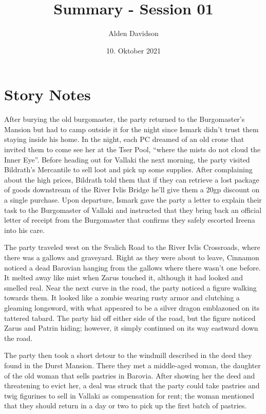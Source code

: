 \documentclass[a4paper,11pt]{article}
\title{Summary - Session 01}
\author{Alden Davidson}
\date{10. Oktober 2021}
\begin{document}
\maketitle


\section{Story Notes}
After burying the old burgomaster, the party returned to the Burgomaster's Mansion but had to camp outside it for
the night since Ismark didn't trust them staying inside his home. In the night, each PC dreamed of an old crone 
that invited them to come see her at the Tser Pool, ``where the mists do not cloud the Inner Eye''. Before 
heading out for Vallaki the next morning, the party visited Bildrath's Mercantile to sell loot and pick up some 
supplies. After complaining about the high prices, Bildrath told them that if they can retrieve a lost package of 
goods downstream of the River Ivlis Bridge he'll give them a 20gp discount on a single purchase. Upon departure, 
Ismark gave the party a letter to explain their task to the Burgomaster of Vallaki and instructed that they bring 
back an official letter of receipt from the Burgomaster that confirms they safely escorted Ireena into his care.

The party traveled west on the Svalich Road to the River Ivlis Crossroads, where there was a gallows and 
graveyard. Right as they were about to leave, Cinnamon noticed a dead Barovian hanging from the gallows where 
there wasn't one before. It melted away like mist when Zarus touched it, although it had looked and smelled 
real. Near the next curve in the road, the party noticed a figure walking towards them. It looked like a zombie 
wearing rusty armor and clutching a gleaming longsword, with what appeared to be a silver dragon emblazoned on 
its tattered tabard. The party hid off either side of the road, but the figure noticed Zarus and Patrin hiding; 
however, it simply continued on its way eastward down the road.

The party then took a short detour to the windmill described in the deed they found in the Durst Mansion. There 
they met a middle-aged woman, the daughter of the old woman that sells pastries in Barovia. After showing her the 
deed and threatening to evict her, a deal was struck that the party could take pastries and twig figurines to 
sell in Vallaki as compensation for rent; the woman mentioned that they should return in a day or two to pick up 
the first batch of pastries.
\end{document}
